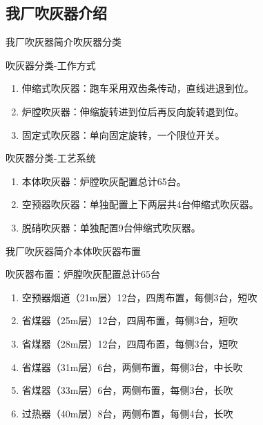 \documentclass[12pt,hyperref={CJKbookmarks=true}]{beamer} %
\begin{document}
\subsection{我厂吹灰器介绍}
\begin{frame}{我厂吹灰器简介}{吹灰器分类}
\begin{block}{吹灰器分类-工作方式}
				\begin{enumerate}
				\item  伸缩式吹灰器：跑车采用双齿条传动，直线进退到位。
				
				\item  炉膛吹灰器：伸缩旋转进到位后再反向旋转退到位。
				
				\item   固定式吹灰器：单向固定旋转，一个限位开关。
				
			\end{enumerate}
		\end{block}
\begin{exampleblock}{吹灰器分类-工艺系统}
\begin{enumerate}
				\item  本体吹灰器：炉膛吹灰配置总计65台。
				
				\item  空预器吹灰器：单独配置上下两层共4台伸缩式吹灰器。
				
				\item   脱硝吹灰器：单独配置9台伸缩式吹灰器。
				
			\end{enumerate}
		\end{exampleblock}
		
	\end{frame}
\begin{frame}{我厂吹灰器简介}{本体吹灰器布置}
\begin{block}{吹灰器布置：炉膛吹灰配置总计65台}
				\begin{enumerate}
				\item  空预器烟道（21m层）12台，四周布置，每侧3台，短吹
				
				\item  省煤器（25m层）12台，四周布置，每侧3台，短吹
				
				\item   省煤器（28m层）12台，四周布置，每侧3台，短吹
\item   省煤器（31m层）6台，两侧布置，每侧3台，中长吹
\item   省煤器（33m层）6台，两侧布置，每侧3台，长吹
\item   过热器（40m层）8台，两侧布置，每侧4台，长吹
				
			\end{enumerate}

		\end{block}

	\end{frame}
\end{document}
